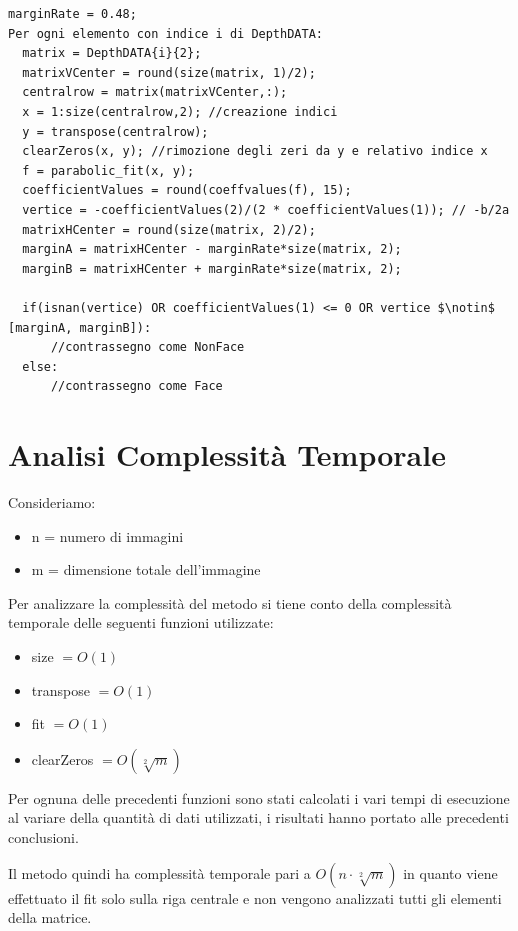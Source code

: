 \documentclass[
  italian,
]{article}
\providecommand{\tightlist}{%
  \setlength{\itemsep}{0pt}\setlength{\parskip}{0pt}}
\begin{document}
\begin{lstlisting}[basicstyle=\small, mathescape=true]
marginRate = 0.48;
Per ogni elemento con indice i di DepthDATA:
  matrix = DepthDATA{i}{2}; 
  matrixVCenter = round(size(matrix, 1)/2);
  centralrow = matrix(matrixVCenter,:);
  x = 1:size(centralrow,2); //creazione indici
  y = transpose(centralrow);
  clearZeros(x, y); //rimozione degli zeri da y e relativo indice x
  f = parabolic_fit(x, y);
  coefficientValues = round(coeffvalues(f), 15);
  vertice = -coefficientValues(2)/(2 * coefficientValues(1)); // -b/2a
  matrixHCenter = round(size(matrix, 2)/2);
  marginA = matrixHCenter - marginRate*size(matrix, 2);
  marginB = matrixHCenter + marginRate*size(matrix, 2);
  
  if(isnan(vertice) OR coefficientValues(1) <= 0 OR vertice $\notin$ [marginA, marginB]):
      //contrassegno come NonFace
  else:
      //contrassegno come Face
\end{lstlisting}


\hypertarget{analisi-complessituxe0-temporale}{%
\section{Analisi Complessità
Temporale}\label{analisi-complessituxe0-temporale}}

Consideriamo:

\begin{itemize}
\tightlist
\item
  n = numero di immagini
\item
  m = dimensione totale dell'immagine
\end{itemize}

Per analizzare la complessità del metodo si tiene conto della
complessità temporale delle seguenti funzioni utilizzate:

\begin{itemize}
\tightlist
\item
  size \(= O(1)\)
\item
  transpose \(= O(1)\)
\item
  fit \(= O(1)\)
\item
  clearZeros \(= O(\sqrt[2]{m}) \)
\end{itemize}

Per ognuna delle precedenti funzioni sono stati calcolati i vari tempi
di esecuzione al variare della quantità di dati utilizzati, i risultati
hanno portato alle precedenti conclusioni.

Il metodo quindi ha complessità temporale pari a \(O(n \cdot \sqrt[2]{m})\) in
quanto viene effettuato il fit solo sulla riga centrale e non vengono analizzati tutti gli elementi della matrice.
\end{document}
